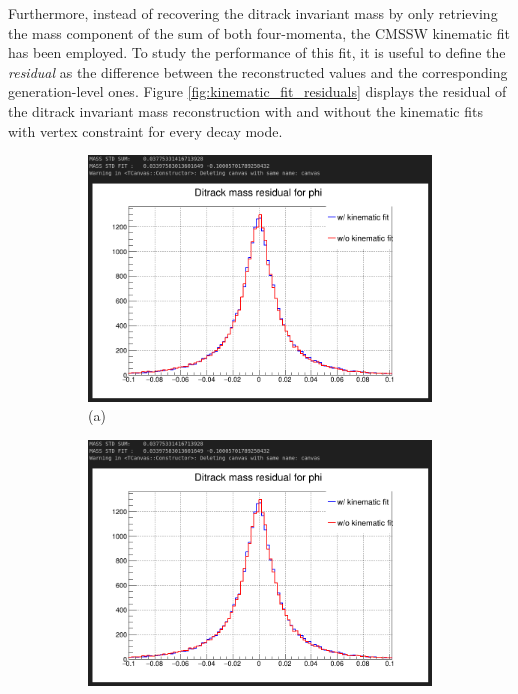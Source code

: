 \begin{myitemlist}
    Furthermore, instead of recovering the ditrack invariant mass by only retrieving the mass component of the sum of both four-momenta, the CMSSW kinematic fit has been employed. To study the performance of this fit, it is useful to define the \textit{residual} as the difference between the reconstructed values and the corresponding generation-level ones. Figure \ref{fig:kinematic_fit_residuals} displays the residual of the ditrack invariant mass reconstruction with and without the kinematic fits with vertex constraint for every decay mode.
    \begin{figure}[!ht]
        \captionsetup[subfigure]{labelformat=empty}
        \vspace*{-0.2cm}
        \centering
        \setlength{\mylength}{\textwidth}
        \begin{subfigure}[t]{0.50\mylength}
                \centering
                \includegraphics[width=0.45\mylength]{resources/plots/Phi3_kinematic_fit_residual.png}
                \caption{\footnotesize (a)}
        \end{subfigure}%
        \begin{subfigure}[t]{0.50\mylength}
                \centering
                \includegraphics[width=0.45\mylength]{resources/plots/Omega_kinematic_fit_residual.png}

\end{subfigure}
\end{figure}
\end{myitemlist}
